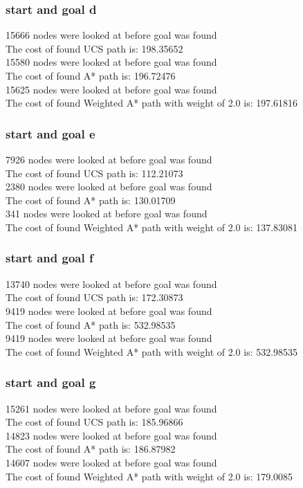 \documentclass[11pt]{article} %
\begin{document}
\subsubsection{start and goal d}
15666 nodes were looked at before goal was found\\
The cost of found UCS path is: 198.35652\\
15580 nodes were looked at before goal was found\\
The cost of found A* path is: 196.72476\\
15625 nodes were looked at before goal was found\\
The cost of found Weighted A* path with weight of 2.0 is: 197.61816\\
\subsubsection{start and goal e}
7926 nodes were looked at before goal was found\\
The cost of found UCS path is: 112.21073\\
2380 nodes were looked at before goal was found\\
The cost of found A* path is: 130.01709\\
341 nodes were looked at before goal was found\\
The cost of found Weighted A* path with weight of 2.0 is: 137.83081\\
\subsubsection{start and goal f}
13740 nodes were looked at before goal was found\\
The cost of found UCS path is: 172.30873\\
9419 nodes were looked at before goal was found\\
The cost of found A* path is: 532.98535\\
9419 nodes were looked at before goal was found\\
The cost of found Weighted A* path with weight of 2.0 is: 532.98535\\
\subsubsection{start and goal g}
15261 nodes were looked at before goal was found\\
The cost of found UCS path is: 185.96866\\
14823 nodes were looked at before goal was found\\
The cost of found A* path is: 186.87982\\
14607 nodes were looked at before goal was found\\
The cost of found Weighted A* path with weight of 2.0 is: 179.0085\\
\end{document}
